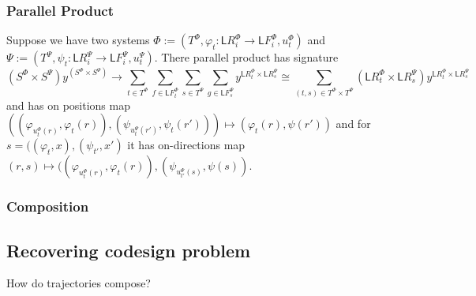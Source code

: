 \documentclass[12pt, a4paper]{article}
\theoremstyle{definition}
\theoremstyle{plain}
\theoremstyle{plain}
\theoremstyle{plain}
\theoremstyle{plain}
\theoremstyle{plain}
\theoremstyle{remark}
\theoremstyle{remark}
\newcommand{\low}{\mathsf{L}}
\begin{document}
\subsubsection{Parallel Product}
Suppose we have two systems $\Phi := (T^\Phi, \varphi_t :\low R^\Phi_i \rightarrow \low F^\Phi_i, u^\Phi_t) $ and $\Psi := (T^\Psi, \psi_t :\low R^\Psi_i \rightarrow \low F^\Psi_i, u^\Psi_t) $. There parallel product has signature
$$(S^\Phi \times S^\Psi) y^{(S^\Phi \times S^\Psi)} \rightarrow \sum_{t \in T^\Phi}\sum_{f \in \low F^\Phi_t} \sum_{s \in T^\Psi} \sum_{g \in \low F^\Psi_s} y^{\low R^\Phi_t \times \low R^\Psi_s} \cong \sum_{(t,s) \in T^\Phi \times T^\Psi} (\low R^\Phi_t \times \low R^\Psi_s) y^{\low R^\Phi_t \times \low R^\Psi_s}  $$
and has on positions map $((\varphi_{u^\Phi_t(r)}, \varphi_t(r)),(\psi_{u^\Psi_t(r')}, \psi_t(r'))) \mapsto (\varphi_t(r), \psi(r'))$ and for $s = ((\varphi_t, x),(\psi_{t'}, x')$ it has on-directions map $(r,s) \mapsto ((\varphi_{u^\Phi_t(r)}, \varphi_t(r)),(\psi_{u^\Psi_{t'}(s)}, \psi(s))$.

\subsubsection{Composition}


\subsection{Recovering codesign problem}

How do trajectories compose?
\end{document}

